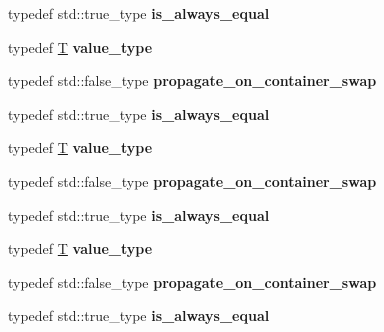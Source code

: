 \begin{DoxyCompactItemize}
\item 
\mbox{\label{structsome__alloc2_acc5ede9dcfed27470598992af2c07bfb}} 
typedef std\+::true\+\_\+type {\bfseries is\+\_\+always\+\_\+equal}
\item 
\mbox{\label{structsome__alloc2_ab7bdd83edbd79faad769611dbbd19a5e}} 
typedef \mbox{\hyperlink{struct_t}{T}} {\bfseries value\+\_\+type}
\item 
\mbox{\label{structsome__alloc2_ad1d285ccc9f402a42deed26170af62e9}} 
typedef std\+::false\+\_\+type {\bfseries propagate\+\_\+on\+\_\+container\+\_\+swap}
\item 
\mbox{\label{structsome__alloc2_acc5ede9dcfed27470598992af2c07bfb}} 
typedef std\+::true\+\_\+type {\bfseries is\+\_\+always\+\_\+equal}
\item 
\mbox{\label{structsome__alloc2_ab7bdd83edbd79faad769611dbbd19a5e}} 
typedef \mbox{\hyperlink{struct_t}{T}} {\bfseries value\+\_\+type}
\item 
\mbox{\label{structsome__alloc2_ad1d285ccc9f402a42deed26170af62e9}} 
typedef std\+::false\+\_\+type {\bfseries propagate\+\_\+on\+\_\+container\+\_\+swap}
\item 
\mbox{\label{structsome__alloc2_acc5ede9dcfed27470598992af2c07bfb}} 
typedef std\+::true\+\_\+type {\bfseries is\+\_\+always\+\_\+equal}
\item 
\mbox{\label{structsome__alloc2_ab7bdd83edbd79faad769611dbbd19a5e}} 
typedef \mbox{\hyperlink{struct_t}{T}} {\bfseries value\+\_\+type}
\item 
\mbox{\label{structsome__alloc2_ad1d285ccc9f402a42deed26170af62e9}} 
typedef std\+::false\+\_\+type {\bfseries propagate\+\_\+on\+\_\+container\+\_\+swap}
\item 
\mbox{\label{structsome__alloc2_acc5ede9dcfed27470598992af2c07bfb}} 
typedef std\+::true\+\_\+type {\bfseries is\+\_\+always\+\_\+equal}
\item 
\mbox{\label{structsome__alloc2_ab7bdd83edbd79faad769611dbbd19a5e}} 

\end{DoxyCompactItemize}
